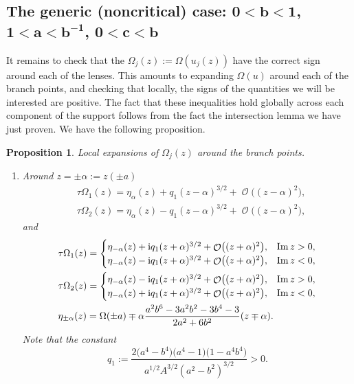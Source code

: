 \documentclass[pdftex]{sigma}
\DeclareMathOperator{\OO}{\mathcal{O}}
\numberwithin{equation}{section}
\newtheorem{Proposition}[Theorem]{Proposition}
 { \theoremstyle{definition}
\newtheorem{Definition}[Theorem]{Definition}
\newtheorem{Note}[Theorem]{Note}
\newtheorem{Example}[Theorem]{Example}
\newtheorem{Remark}[Theorem]{Remark} }
\begin{document}
\subsection[The generic (noncritical) case: $0< b < 1$, $1 < a < b^{-1}$, $0 < c < b$]{The generic (noncritical) case: $\boldsymbol{0< b < 1}$, $\boldsymbol{1 < a < b^{-1}}$, $\boldsymbol{0 < c < b}$}
It remains to check that the $\Omega_j(z):=\Omega(u_j(z))$ have the correct sign around each of the lenses. This amounts to expanding $\Omega(u)$ around each of the
branch points, and checking that locally, the signs of the quantities we will be interested are positive. The fact that these inequalities hold
globally across each component of the support follows from the fact the intersection lemma we have just proven. We have the following proposition.

\begin{Proposition} \label{local-expansions-generic}
 Local expansions of $\Omega_j(z)$ around the branch points.
 \begin{enumerate}\itemsep=0pt
 \item[$(1)$] Around $z = \pm\alpha := z(\pm a)$
 \begin{align*}
 &\tau\Omega_1(z)= \eta_\alpha(z) + q_1 (z-\alpha)^{3/2} +\OO\bigl( (z-\alpha)^{2} \bigr),\\
 &\tau\Omega_2(z)= \eta_\alpha(z) - q_1 (z-\alpha)^{3/2} +\OO\bigl( (z-\alpha)^{2} \bigr),
 \end{align*}
 and
 \begin{align*}
 &\tau\Omega_1(z)= \begin{cases}
 \eta_{-\alpha}(z) + {\rm i}q_1 (z+\alpha)^{3/2} +\OO\bigl( (z+\alpha)^{2} \bigr), & \operatorname{Im} z >0,\\
 \eta_{-\alpha}(z) - {\rm i}q_1 (z+\alpha)^{3/2} +\OO\bigl( (z+\alpha)^{2} \bigr), & \operatorname{Im} z <0,
 \end{cases} \\
 &\tau\Omega_2(z)=
 \begin{cases}
 \eta_{-\alpha}(z) - {\rm i}q_1 (z+\alpha)^{3/2} +\OO\bigl( (z+\alpha)^{2} \bigr), & \operatorname{Im} z >0,\\
 \eta_{-\alpha}(z) + {\rm i}q_1 (z+\alpha)^{3/2} +\OO\bigl( (z+\alpha)^{2} \bigr), & \operatorname{Im} z <0,
 \end{cases}\\
 & \eta_{\pm \alpha} (z) = \Omega(\pm a) \mp \alpha\frac{a^2b^6 - 3a^2b^2 - 3b^4 - 3}{2a^2 + 6b^2}(z\mp \alpha).
 \end{align*}
Note that the constant
 \[
 q_1:=\frac{2\bigl(a^4-b^4\bigr)\bigl(a^4-1\bigr)\bigl(1-a^4b^4\bigr)}{a^{1/2}A^{3/2} (a^2-b^2)^{3/2}} >0.
 \]


\end{enumerate}
\end{Proposition}
\end{document}
